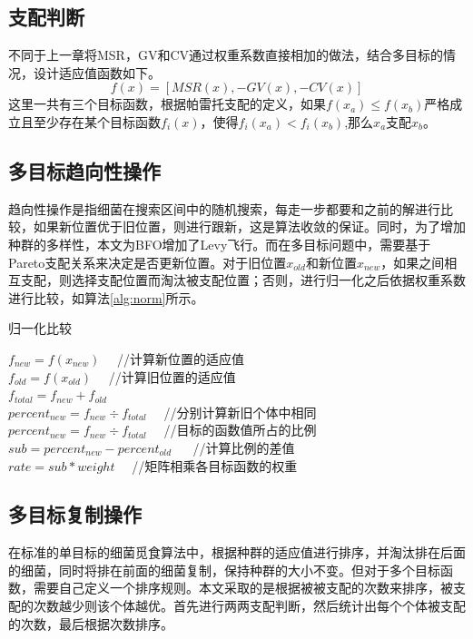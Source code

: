     \subsection{支配判断}
    不同于上一章将MSR，GV和CV通过权重系数直接相加的做法，结合多目标的情况，设计适应值函数如下。
    \begin{equation}
      f(x) = [MSR(x), -GV(x), -CV(x)]  
    \end{equation}
    这里一共有三个目标函数，根据帕雷托支配的定义，如果$f(x_a)\le f(x_b)$严格成立且至少存在某个目标函数$f_i(x)$，使得$f_i(x_a)<f_i(x_b)$,那么$x_a$支配$x_b$。
    
    \subsection{多目标趋向性操作}
    趋向性操作是指细菌在搜索区间中的随机搜索，每走一步都要和之前的解进行比较，如果新位置优于旧位置，则进行跟新，这是算法收敛的保证。同时，为了增加种群的多样性，本文为BFO增加了Levy飞行。而在多目标问题中，需要基于Pareto支配关系来决定是否更新位置。对于旧位置$x_{old}$和新位置$x_{new}$，如果之间相互支配，则选择支配位置而淘汰被支配位置；否则，进行归一化之后依据权重系数进行比较，如算法\ref{alg:norm}所示。

    \begin{algorithm}[htbp]
    \caption{归一化比较} \label{alg:norm}
    $f_{new} = f(x_{new})$　   //计算新位置的适应值\\
    $f_{old} = f(x_{old})$　 //计算旧位置的适应值\\
    $f_{total} = f_{new} + f_{old}$　   \\
    $percent_{new} = f_{new} \div f_{total}$　 //分别计算新旧个体中相同\\
    $percent_{new} = f_{new} \div f_{total}$　 //目标的函数值所占的比例\\
    $sub = percent_{new} - percent_{old}$ 　 //计算比例的差值\\
    $rate = sub \ast weight$　 //矩阵相乘各目标函数的权重\\
    \end{algorithm}

    \subsection{多目标复制操作}
    在标准的单目标的细菌觅食算法中，根据种群的适应值进行排序，并淘汰排在后面的细菌，同时将排在前面的细菌复制，保持种群的大小不变。但对于多个目标函数，需要自己定义一个排序规则。本文采取的是根据被被支配的次数来排序，被支配的次数越少则该个体越优。首先进行两两支配判断，然后统计出每个个体被支配的次数，最后根据次数排序。

